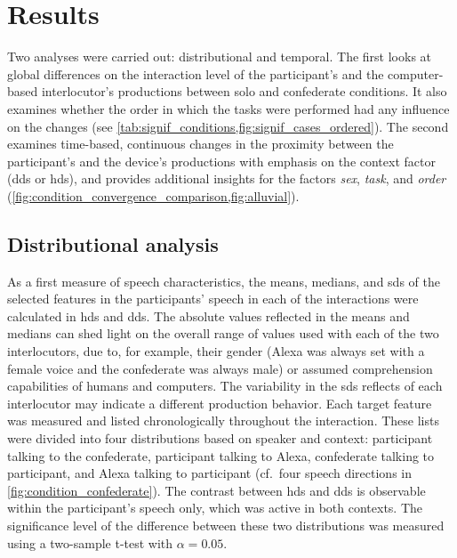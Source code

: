 \section{Results}
\label{sec:results_hhci}

Two analyses were carried out: distributional and temporal.
The first looks at global differences on the interaction level of the participant's and the computer-based interlocutor's productions between solo and confederate conditions.
It also examines whether the order in which the tasks were performed had any influence on the changes (see \cref{tab:signif_conditions,fig:signif_cases_ordered}).
The second examines time-based, continuous changes in the proximity between the participant's and the device's productions with emphasis on the context factor (\ac{dds} or \ac{hds}), and provides additional insights for the factors \emph{sex}, \emph{task}, and \emph{order} (\cref{fig:condition_convergence_comparison,fig:alluvial}).

\subsection{Distributional analysis}
\label{subsec:distributional_analysis}

As a first measure of speech characteristics, the means, medians, and \aclp{sd} of the selected features in the participants' speech in each of the interactions were calculated in \ac{hds} and \ac{dds}.
The absolute values reflected in the means and medians can shed light on the overall range of values used with each of the two interlocutors, due to, for example, their gender (Alexa was always set with a female voice and the confederate was always male) or assumed comprehension capabilities of humans and computers.
The variability in the \aclp{sd} reflects of each interlocutor may indicate a different production behavior.
Each target feature was measured and listed chronologically throughout the interaction.
These lists were divided into four distributions based on speaker and context:
participant talking to the confederate, participant talking to Alexa, confederate talking to participant, and Alexa talking to participant (cf.\ four speech directions in \cref{fig:condition_confederate}).
The contrast between \ac{hds} and \ac{dds} is observable within the participant's speech only, which was active in both contexts.
The significance level of the difference between these two distributions was measured using a two-sample t-test with $\alpha=0.05$.

